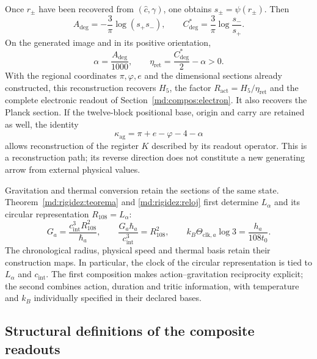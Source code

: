 Once $r_\pm$ have been recovered from $(\widehat c,\gamma)$, one obtains
$s_\pm=\psi(r_\pm)$. Then
\begin{equation}
 A_{\deg}=-\frac{3}{\pi}\log(s_+s_-),\qquad
 C^*_{\deg}=\frac{3}{\pi}\log\frac{s_-}{s_+}.
 \label{md:compos:restitucion-angular}
\end{equation}
On the generated image and in its positive orientation,
\begin{equation}
 \alpha=\frac{A_{\deg}}{1000},\qquad
 \eta_{\mathrm{ret}}=\frac{C^*_{\deg}}{2}-\alpha>0.
 \label{md:compos:restitucion-alpha-eta}
\end{equation}
With the regional coordinates $\pi,\varphi,e$ and the dimensional sections
already constructed, this reconstruction recovers $H_5$, the factor
$R_{\mathrm{act}}=H_5/\eta_{\mathrm{ret}}$ and the complete electronic
readout of Section~\ref{md:compos:electron}. It also recovers the Planck
section. If the twelve-block positional base, origin and carry are retained
as well, the identity
\begin{equation}
 \kappa_{\mathrm{ag}}=\pi+e-\varphi-4-\alpha
 \label{md:compos:restitucion-k}
\end{equation}
allows reconstruction of the register $K$ described by its readout operator.
This is a reconstruction path; its reverse direction does not constitute
a new generating arrow from external physical values.

Gravitation and thermal conversion retain the sections of the same
state. Theorem~\ref{md:rigidez:teorema} and
\eqref{md:rigidez:reloj} first determine $L_\alpha$ and its
circular representation $R_{108}=L_\alpha$:
\begin{equation}
 G_a=\frac{c_{\mathrm{int}}^3R_{108}^2}{\hbar_a},\qquad
 \frac{G_a\hbar_a}{c_{\mathrm{int}}^3}=R_{108}^2,
 \qquad
 k_B\Theta_{\mathrm{clk},a}\log3=\frac{h_a}{108t_0}.
 \label{md:compos:gravedad-termica}
\end{equation}
The chronological radius, physical speed and thermal basis retain their
construction maps. In particular, the clock of the circular representation
is tied to $L_\alpha$ and $c_{\mathrm{int}}$. The first
composition makes action--gravitation reciprocity explicit; the second
combines action, duration and tritic information, with temperature and
$k_B$ individually specified in their declared bases.

\subsection{Structural definitions of the composite readouts}
\label{md:compos:definiciones}

